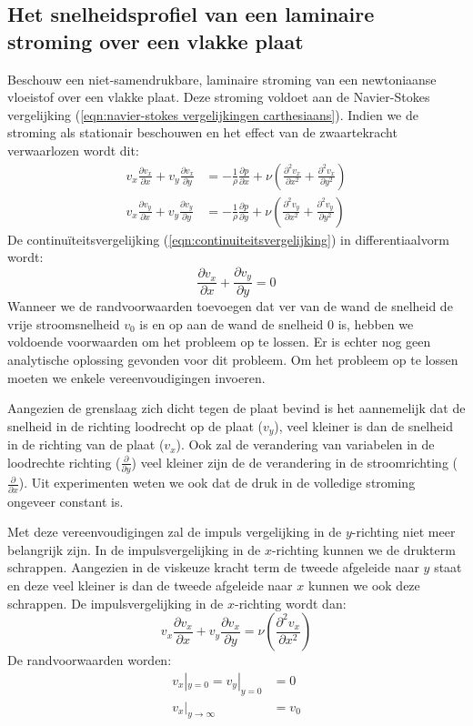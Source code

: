 		\subsection{Het snelheidsprofiel van een laminaire stroming over een vlakke plaat}
Beschouw een niet-samendrukbare, laminaire stroming van een newtoniaanse vloeistof over een vlakke plaat. Deze stroming voldoet aan de Navier-Stokes vergelijking (\ref{eqn:navier-stokes vergelijkingen carthesiaans}). Indien we de stroming als stationair beschouwen en het effect van de zwaartekracht verwaarlozen wordt dit:
\begin{align}
	v_x \frac{\partial v_x}{\partial x} + v_y \frac{\partial v_x}{\partial y} &= -\frac{1}{\rho}\frac{\partial p}{\partial x} + \nu \left( \frac{\partial^2 v_x}{\partial x^2} + \frac{\partial^2 v_x}{\partial y^2} \right) \\
	v_x \frac{\partial v_y}{\partial x} + v_y \frac{\partial v_y}{\partial y} &= -\frac{1}{\rho}\frac{\partial p}{\partial y} + \nu \left( \frac{\partial^2 v_y}{\partial x^2} + \frac{\partial^2 v_y}{\partial y^2} \right)
\end{align}
De continuïteitsvergelijking (\ref{eqn:continuiteitsvergelijking}) in differentiaalvorm wordt:
\begin{equation}
	\frac{\partial v_x}{\partial x} + \frac{\partial v_y}{\partial y} = 0
\end{equation}
Wanneer we de randvoorwaarden toevoegen dat ver van de wand de snelheid de vrije stroomsnelheid $v_0$ is en op aan de wand de snelheid 0 is, hebben we voldoende voorwaarden om het probleem op te lossen. Er is echter nog geen analytische oplossing gevonden voor dit probleem. Om het probleem op te lossen moeten we enkele vereenvoudigingen invoeren. 

Aangezien de grenslaag zich dicht tegen de plaat bevind is het aannemelijk dat de snelheid in de richting loodrecht op de plaat ($v_y$), veel kleiner is dan de snelheid in de richting van de plaat ($v_x$). Ook zal de verandering van variabelen in de loodrechte richting ($\frac{\partial}{\partial y}$) veel kleiner zijn de de verandering in de stroomrichting ($\frac{\partial}{\partial x}$). Uit experimenten weten we ook dat de druk in de volledige stroming ongeveer constant is. 

Met deze vereenvoudigingen zal de impuls vergelijking in de $y$-richting niet meer belangrijk zijn. In de impulsvergelijking in de $x$-richting kunnen we de drukterm schrappen. Aangezien in de viskeuze kracht term de tweede afgeleide naar $y$ staat en deze veel kleiner is dan de tweede afgeleide naar $x$ kunnen we ook deze schrappen. De impulsvergelijking in de $x$-richting wordt dan:
\begin{equation}
	v_x \frac{\partial v_x}{\partial x} + v_y \frac{\partial v_x}{\partial y} = \nu \left( \frac{\partial^2 v_x}{\partial x^2} \right)
\end{equation}
De randvoorwaarden worden:
\begin{align}
	v_x|_{y=0} = v_y|_{y=0} &= 0 \\
	v_x|_{y\rightarrow\infty} &= v_0
\end{align}

